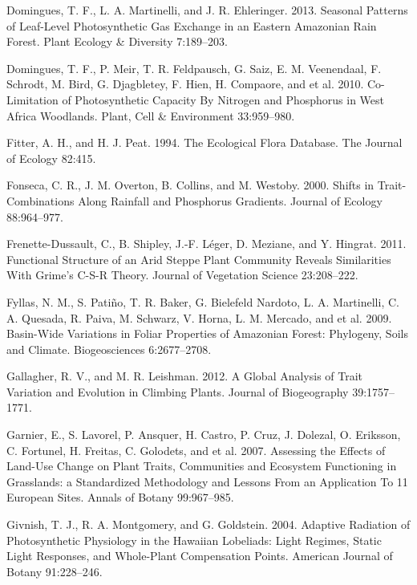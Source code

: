 \documentclass[11pt]{article}
\begin{document}
\begin{hangparas}{1.5em}{1}
\hypertarget{citeproc_bib_item_44}{Domingues, T. F., L. A. Martinelli, and J. R. Ehleringer. 2013. Seasonal Patterns of Leaf-Level Photosynthetic Gas Exchange in an Eastern Amazonian Rain Forest. Plant Ecology \& Diversity 7:189–203.}

\hypertarget{citeproc_bib_item_45}{Domingues, T. F., P. Meir, T. R. Feldpausch, G. Saiz, E. M. Veenendaal, F. Schrodt, M. Bird, G. Djagbletey, F. Hien, H. Compaore, and et al. 2010. Co-Limitation of Photosynthetic Capacity By Nitrogen and Phosphorus in West Africa Woodlands. Plant, Cell \& Environment 33:959–980.}

\hypertarget{citeproc_bib_item_46}{Fitter, A. H., and H. J. Peat. 1994. The Ecological Flora Database. The Journal of Ecology 82:415.}

\hypertarget{citeproc_bib_item_47}{Fonseca, C. R., J. M. Overton, B. Collins, and M. Westoby. 2000. Shifts in Trait-Combinations Along Rainfall and Phosphorus Gradients. Journal of Ecology 88:964–977.}

\hypertarget{citeproc_bib_item_48}{Frenette-Dussault, C., B. Shipley, J.-F. Léger, D. Meziane, and Y. Hingrat. 2011. Functional Structure of an Arid Steppe Plant Community Reveals Similarities With Grime’s C-S-R Theory. Journal of Vegetation Science 23:208–222.}

\hypertarget{citeproc_bib_item_49}{Fyllas, N. M., S. Patiño, T. R. Baker, G. Bielefeld Nardoto, L. A. Martinelli, C. A. Quesada, R. Paiva, M. Schwarz, V. Horna, L. M. Mercado, and et al. 2009. Basin-Wide Variations in Foliar Properties of Amazonian Forest: Phylogeny, Soils and Climate. Biogeosciences 6:2677–2708.}

\hypertarget{citeproc_bib_item_50}{Gallagher, R. V., and M. R. Leishman. 2012. A Global Analysis of Trait Variation and Evolution in Climbing Plants. Journal of Biogeography 39:1757–1771.}

\hypertarget{citeproc_bib_item_51}{Garnier, E., S. Lavorel, P. Ansquer, H. Castro, P. Cruz, J. Dolezal, O. Eriksson, C. Fortunel, H. Freitas, C. Golodets, and et al. 2007. Assessing the Effects of Land-Use Change on Plant Traits, Communities and Ecosystem Functioning in Grasslands: a Standardized Methodology and Lessons From an Application To 11 European Sites. Annals of Botany 99:967–985.}

\hypertarget{citeproc_bib_item_52}{Givnish, T. J., R. A. Montgomery, and G. Goldstein. 2004. Adaptive Radiation of Photosynthetic Physiology in the Hawaiian Lobeliads: Light Regimes, Static Light Responses, and Whole-Plant Compensation Points. American Journal of Botany 91:228–246.}


\end{hangparas}
\end{document}
